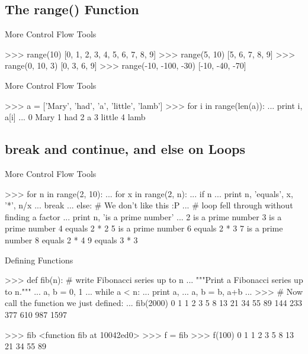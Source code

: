 \documentclass[11pt]{beamer}
\begin{document}
\subsection{The range() Function}
\begin{frame}[containsverbatim]{More Control Flow Tools}
\begin{python}
>>> range(10)
[0, 1, 2, 3, 4, 5, 6, 7, 8, 9]
>>> range(5, 10)
[5, 6, 7, 8, 9]
>>> range(0, 10, 3)
[0, 3, 6, 9]
>>> range(-10, -100, -30)
[-10, -40, -70]
\end{python}
\end{frame}


\begin{frame}[containsverbatim]{More Control Flow Tools}
\begin{python}
>>> a = ['Mary', 'had', 'a', 'little', 'lamb']
>>> for i in range(len(a)):
...    print i, a[i]
...
0 Mary
1 had
2 a
3 little
4 lamb
\end{python}
\end{frame}

\subsection{break and continue, and else on Loops}
\begin{frame}[containsverbatim]{More Control Flow Tools}
\begin{python}
>>> for n in range(2, 10):
...    for x in range(2, n):
...        if n %
...            print n, 'equals', x, '*', n/x
...            break
...    else: # We don't like this :P
...        # loop fell through without finding a factor
...        print n, 'is a prime number'
...
2 is a prime number
3 is a prime number
4 equals 2 * 2
5 is a prime number
6 equals 2 * 3
7 is a prime number
8 equals 2 * 4
9 equals 3 * 3
\end{python}
\end{frame}


\begin{frame}[containsverbatim]{Defining Functions}
\begin{python}
>>> def fib(n):    # write Fibonacci series up to n
...    """Print a Fibonacci series up to n."""
...    a, b = 0, 1
...    while a < n:
...        print a,
...        a, b = b, a+b
...
>>> # Now call the function we just defined:
... fib(2000)
0 1 1 2 3 5 8 13 21 34 55 89 144 233 377 610 987 1597

>>> fib
<function fib at 10042ed0>
>>> f = fib
>>> f(100)
0 1 1 2 3 5 8 13 21 34 55 89
\end{python}
\end{frame}
\end{document}
